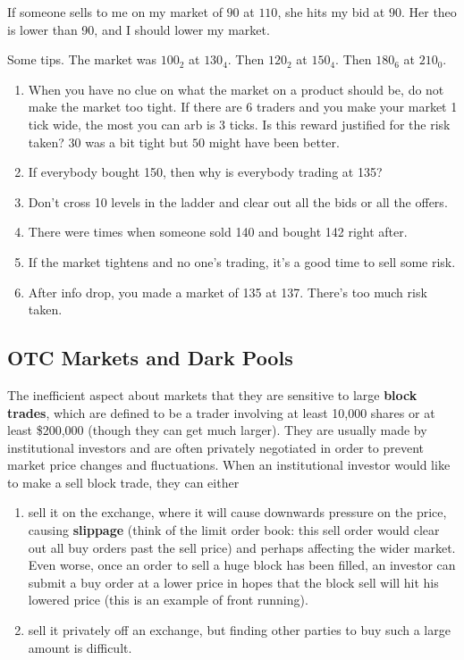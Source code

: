 \documentclass{article}
\begin{document}
    If someone sells to me on my market of $90$ at $110$, she hits my bid at $90$. Her theo is lower than 90, and I should lower my market.


    \begin{example}[2nd Session]
      Some tips. The market was $100_2$ at $130_4$. Then $120_2$ at $150_4$. Then $180_6$ at $210_0$. 
      \begin{enumerate}
        \item When you have no clue on what the market on a product should be, do not make the market too tight. If there are 6 traders and you make your market 1 tick wide, the most you can arb is 3 ticks. Is this reward justified for the risk taken? $30$ was a bit tight but $50$ might have been better. 

        \item If everybody bought 150, then why is everybody trading at 135?  

        \item Don't cross 10 levels in the ladder and clear out all the bids or all the offers. 

        \item There were times when someone sold 140 and bought 142 right after. 

        \item If the market tightens and no one's trading, it's a good time to sell some risk. 

        \item After info drop, you made a market of 135 at 137. There's too much risk taken. 
      \end{enumerate}
    \end{example}

  \subsection{OTC Markets and Dark Pools}

    The inefficient aspect about markets that they are sensitive to large \textbf{block trades}, which are defined to be a trader involving at least 10,000 shares or at least \$200,000 (though they can get much larger). They are usually made by institutional investors and are often privately negotiated in order to prevent market price changes and fluctuations. When an institutional investor would like to make a sell block trade, they can either 

    \begin{enumerate}
      \item sell it on the exchange, where it will cause downwards pressure on the price, causing \textbf{slippage} (think of the limit order book: this sell order would clear out all buy orders past the sell price) and perhaps affecting the wider market. Even worse, once an order to sell a huge block has been filled, an investor can submit a buy order at a lower price in hopes that the block sell will hit his lowered price (this is an example of front running). 

      \item sell it privately off an exchange, but finding other parties to buy such a large amount is difficult. 
    \end{enumerate}
\end{document}
